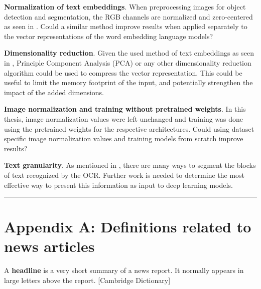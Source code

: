 \documentclass[oneside, english, bibtex]{kththesis}
\begin{document}
\textbf{Normalization of text embeddings}. When preprocessing images for object detection and segmentation, the RGB channels are normalized and zero-centered as seen in . Could a similar method improve results when applied separately to the vector representations of the word embedding language models?

\textbf{Dimensionality reduction}. Given the used method of text embeddings as seen in , Principle Component Analysis (PCA) or any other dimensionality reduction algorithm could be used to compress the vector representation. This could be useful to limit the memory footprint of the input, and potentially strengthen the impact of the added dimensions.

\textbf{Image normalization and training without pretrained weights}. In this thesis, image normalization values were left unchanged and training was done using the pretrained weights for the respective architectures. Could using dataset specific image normalization values and training models from scratch improve results?

\textbf{Text granularity}. As mentioned in , there are many ways to segment the blocks of text recognized by the OCR. Further work is needed to determine the most effective way to present this information as input to deep learning models.


\noindent\rule{\textwidth}{0.4mm}

\cleardoublepage
\renewcommand{\bibname}{References}

\ifbiblatex
    \printbibliography[heading=bibintoc]
\else
    
\fi



\appendix
\renewcommand{\chaptermark}[1]{\markboth{Appendix \thechapter\relax:\thinspace\relax#1}{}}

\section{Appendix A: Definitions related to news articles}
\label{app:newsarticle}

\begin{definition}
\label{headline}
A \textbf{headline} is a very short summary of a news report. It normally appears in large letters above the report. [Cambridge Dictionary]
\end{definition}
\end{document}
